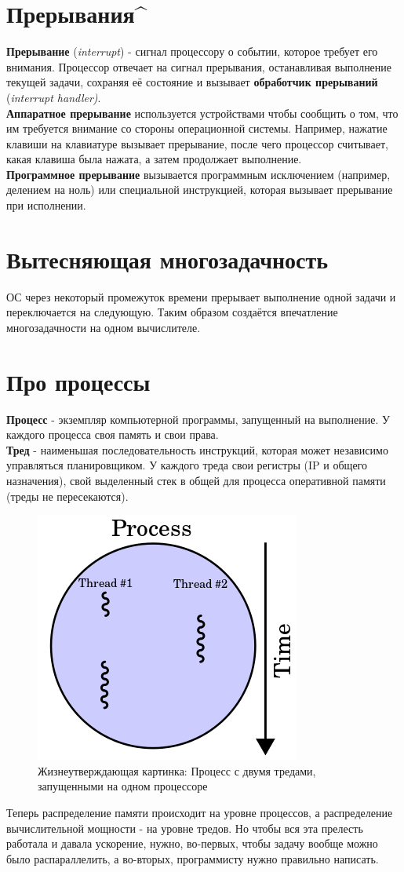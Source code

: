 \documentclass[12pt, a4paper]{article}
\begin{document}
\section{Прерывания\textasciicircum}
\textbf{Прерывание} (\textit{interrupt}) - сигнал процессору о событии, которое требует его внимания. Процессор отвечает на сигнал прерывания, останавливая выполнение текущей задачи, сохраняя её состояние и вызывает \textbf{обработчик прерываний} (\textit{interrupt handler)}.\\
\textbf{Аппаратное прерывание} используется устройствами чтобы сообщить о том, что им требуется внимание со стороны операционной системы. Например, нажатие клавиши на клавиатуре вызывает прерывание, после чего процессор считывает, какая клавиша была нажата, а затем продолжает выполнение.\\
\textbf{Программное прерывание} вызывается программным исключением (например, делением на ноль) или специальной инструкцией, которая вызывает прерывание при исполнении.\\
\section{Вытесняющая многозадачность}
ОС через некоторый промежуток времени прерывает выполнение одной задачи и переключается на следующую. Таким образом создаётся впечатление многозадачности на одном вычислителе.\\
\section{Про процессы}
\textbf{Процесс} - экземпляр компьютерной программы, запущенный на выполнение. У каждого процесса своя память и свои права.\\
\textbf{Тред} - наименьшая последовательность инструкций, которая может независимо управляться планировщиком. У каждого треда свои регистры (IP и общего назначения), свой выделенный стек в общей для процесса оперативной памяти (треды не пересекаются).\\
\begin{figure}[h]
    \centering
    \includegraphics[width=0.4\linewidth]{images/process.png}
    \caption{Жизнеутверждающая картинка: Процесс с двумя тредами, запущенными на одном процессоре}
    \label{fig:Process}
\end{figure}
Теперь распределение памяти происходит на уровне процессов, а распределение вычислительной мощности - на уровне тредов. Но чтобы вся эта прелесть работала и давала ускорение, нужно, во-первых, чтобы задачу вообще можно было распараллелить, а во-вторых, программисту нужно правильно написать.
\end{document}
